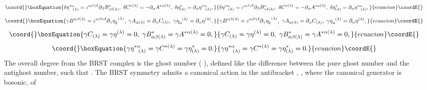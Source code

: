 \documentclass[a4paper,12pt]{article}
\begin{document}
\begin{equation}\coord{}\boxEquation{
\delta \eta _{\;\;\;(\lambda )}^{*\alpha }=\varepsilon ^{\alpha \beta \gamma
\delta }\partial _{\beta }B_{\gamma \delta (\lambda )}^{*},\;\delta
C^{*(\lambda )}=-\partial _{\alpha }A^{*\alpha (\lambda )},\;\delta \eta
_{(\lambda )}^{*}=\partial _{\alpha }\eta _{\;\;\;(\lambda )}^{*\alpha },
\label{cin12}
}{
\delta \eta _{\;\;\;(\lambda )}^{*\alpha }=\varepsilon ^{\alpha \beta \gamma
\delta }\partial _{\beta }B_{\gamma \delta (\lambda )}^{*},\;\delta
C^{*(\lambda )}=-\partial _{\alpha }A^{*\alpha (\lambda )},\;\delta \eta
_{(\lambda )}^{*}=\partial _{\alpha }\eta _{\;\;\;(\lambda )}^{*\alpha },
}{ecuacion}\coordE{}\end{equation}
\begin{equation}\coord{}\boxEquation{
\gamma B^{\alpha \beta (\lambda )}=\varepsilon ^{\alpha \beta \gamma \delta
}\partial _{\gamma }\eta _{\delta }^{\;\;(\lambda )},\;\gamma A_{\alpha
(\lambda )}=\partial _{\alpha }C_{(\lambda )},\;\gamma \eta _{\alpha
}^{\;\;(\lambda )}=\partial _{\alpha }\eta ^{(\lambda )},  \label{cin13}
}{
\gamma B^{\alpha \beta (\lambda )}=\varepsilon ^{\alpha \beta \gamma \delta
}\partial _{\gamma }\eta _{\delta }^{\;\;(\lambda )},\;\gamma A_{\alpha
(\lambda )}=\partial _{\alpha }C_{(\lambda )},\;\gamma \eta _{\alpha
}^{\;\;(\lambda )}=\partial _{\alpha }\eta ^{(\lambda )},  }{ecuacion}\coordE{}\end{equation}
\begin{equation}\coord{}\boxEquation{
\gamma C_{(\lambda )}=\gamma \eta ^{(\lambda )}=0,\;\gamma B_{\alpha \beta
(\lambda )}^{*}=\gamma A^{*\alpha (\lambda )}=0,  \label{cin14}
}{
\gamma C_{(\lambda )}=\gamma \eta ^{(\lambda )}=0,\;\gamma B_{\alpha \beta
(\lambda )}^{*}=\gamma A^{*\alpha (\lambda )}=0,  }{ecuacion}\coordE{}\end{equation}
\begin{equation}\coord{}\boxEquation{
\gamma \eta _{\;\;\;(\lambda )}^{*\alpha }=\gamma C^{*(\lambda )}=\gamma
\eta _{(\lambda )}^{*}=0.  \label{cin15}
}{
\gamma \eta _{\;\;\;(\lambda )}^{*\alpha }=\gamma C^{*(\lambda )}=\gamma
\eta _{(\lambda )}^{*}=0.  }{ecuacion}\coordE{}\end{equation}
The overall degree from the BRST complex is the ghost number (\coordHE{}%
), defined like the difference between the pure ghost number and the
antighost number, such that \coordHE{}. The BRST
symmetry admits a canonical action in the antibracket \myHighlight{$\left( ,\right) $}\coordHE{}, \coordHE{}, where the canonical generator \coordHE{} is bosonic, of
\end{document}
